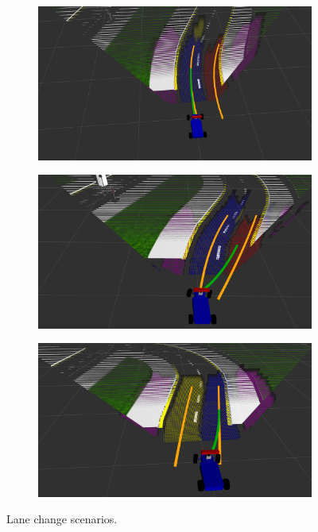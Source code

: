 \begin{figure}[h]
\begin{subfigure}[b]{0.45\linewidth}
  \end{subfigure}
  \begin{subfigure}[b]{0.45\linewidth}
    \includegraphics[width=\linewidth]{figures/experiments/overtaking2-pc.png}
  \end{subfigure}
  \begin{subfigure}[b]{0.45\linewidth}
    \includegraphics[width=\linewidth]{figures/experiments/overtaking3-pc.png}
  \end{subfigure}
  \begin{subfigure}[b]{0.45\linewidth}
    \includegraphics[width=\linewidth]{figures/experiments/overtaking4-pc.png}
  \end{subfigure}
  \caption[Lane change scenarios]{Lane change scenarios.}
  \label{figure:lane-change}
\end{figure}

